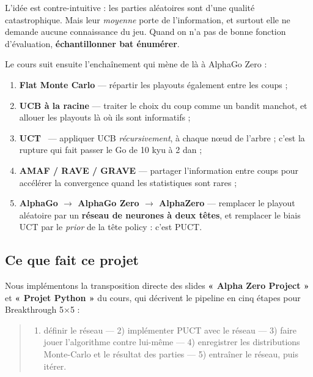 \documentclass[11pt,a4paper]{article}
\begin{document}
L'idée est contre-intuitive : les parties aléatoires sont d'une qualité
catastrophique. Mais leur \emph{moyenne} porte de l'information, et surtout elle ne
demande aucune connaissance du jeu. Quand on n'a pas de bonne fonction
d'évaluation, \textbf{échantillonner bat énumérer}.

Le cours suit ensuite l'enchaînement qui mène de là à AlphaGo Zero :

\begin{enumerate}
\def\labelenumi{\arabic{enumi}.}
\setlength{\itemsep}{1pt}\setlength{\parskip}{0pt}
\item
  \textbf{Flat Monte Carlo} --- répartir les playouts également entre les coups ;
\item
  \textbf{UCB à la racine} --- traiter le choix du coup comme un bandit manchot, et
  allouer les playouts là où ils sont informatifs ;
\item
  \textbf{UCT}~\cite{kocsis2006} --- appliquer UCB \emph{récursivement}, à chaque
  nœud de l'arbre ; c'est la rupture qui fait passer le Go de 10 kyu à 2 dan ;
\item
  \textbf{AMAF / RAVE / GRAVE} --- partager l'information entre coups pour accélérer
  la convergence quand les statistiques sont rares ;
\item
  \textbf{AlphaGo $\rightarrow$ AlphaGo Zero $\rightarrow$ AlphaZero} --- remplacer le playout aléatoire par
  un \textbf{réseau de neurones à deux têtes}, et remplacer le biais UCT par le
  \emph{prior} de la tête policy : c'est PUCT.
\end{enumerate}

\subsection{Ce que fait ce projet}\label{ce-que-fait-ce-projet}

Nous implémentons la transposition directe des slides \textbf{« Alpha Zero Project »}
et \textbf{« Projet Python »} du cours, qui décrivent le pipeline en cinq étapes pour
Breakthrough 5$\times$5 :

\begin{quote}
\begin{enumerate}
\def\labelenumi{\arabic{enumi})}
\setlength{\itemsep}{1pt}\setlength{\parskip}{0pt}
\item
  définir le réseau --- 2) implémenter PUCT avec le réseau --- 3) faire jouer
  l'algorithme contre lui-même --- 4) enregistrer les distributions Monte-Carlo et
  le résultat des parties --- 5) entraîner le réseau, puis itérer.
\end{enumerate}
\end{quote}
\end{document}
